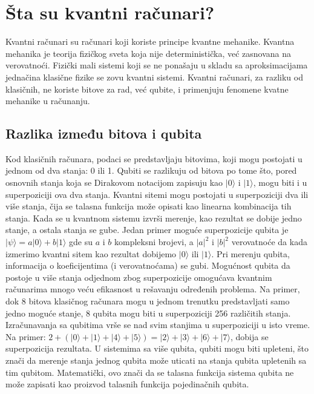\documentclass[fleqn, 12pt]{article}
\begin{document}


\setcounter{tocdepth}{2}
\tableofcontents

\newpage

\section{Šta su kvantni računari?}

\begin{text}
Kvantni računari su računari koji koriste principe kvantne mehanike. Kvantna mehanika je teorija fizičkog sveta koja nije deterministička, već zasnovana na verovatnoći. Fizički mali sistemi koji se ne ponašaju u skladu sa aproksimacijama jednačina klasične fizike se zovu kvantni sistemi. \cite{G1} Kvantni računari, za razliku od klasičnih, ne koriste bitove za rad, već qubite, i primenjuju fenomene kvatne mehanike u računanju.
\end{text}

\subsection{Razlika između bitova i qubita}

\begin{text}
Kod klasičnih računara, podaci se predstavljaju bitovima, koji mogu postojati u jednom od dva stanja: 0 ili 1. Qubiti se razlikuju od bitova po tome što, pored osnovnih stanja koja se Dirakovom notacijom zapisuju kao \(|0\rangle\) i \(|1\rangle\), mogu biti i u superpoziciji ova dva stanja. Kvantni sitemi mogu postojati u superpoziciji dva ili više stanja, čija se talasna funkcija može opisati kao linearna kombinacija tih stanja. \cite{G1} Kada se u kvantnom sistemu izvrši merenje, kao rezultat se dobije jedno stanje, a ostala stanja se gube. Jedan primer moguće superpozicije qubita je \(|\psi\rangle = a|0\rangle + b|1\rangle\) gde su \(a\) i \(b\) kompleksni brojevi, a \(|a|^2\) i \(|b|^2\) verovatnoće da kada izmerimo kvantni sitem kao rezultat dobijemo \(|0\rangle\) ili \(|1\rangle\). Pri merenju qubita, informacija o koeficijentima (i verovatnoćama) se gubi. \cite{G1} Mogućnost qubita da postoje u više stanja odjednom zbog superpozicije omogućava kvantnim računarima mnogo veću efikasnost u rešavanju određenih problema. Na primer, dok 8 bitova klasičnog računara mogu u jednom trenutku predstavljati samo jedno moguće stanje, 8 qubita mogu biti u superpoziciji 256 različitih stanja. Izračunavanja sa qubitima vrše se nad svim stanjima u superpoziciji u isto vreme. Na primer: \(2 + (|0\rangle + |1\rangle + |4\rangle + |5\rangle) = |2\rangle + |3\rangle + |6\rangle + |7\rangle\), dobija se superpozicija rezultata. U sistemima sa više qubita, qubiti mogu biti upleteni, što znači da merenje stanja jednog qubita može uticati na stanja qubita upletenih sa tim qubitom. Matematički, ovo znači da se talasna funkcija sistema qubita ne može zapisati kao proizvod talasnih funkcija pojedinačnih qubita. \cite{G1}
\end{text}
\end{document}
